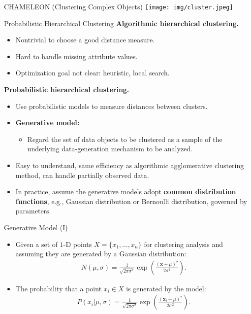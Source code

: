\begin{frame}{CHAMELEON (Clustering Complex Objects)}
	\centering
	\texttt{[image: img/cluster.jpeg]}
\end{frame}

\begin{frame}{Probabilistic Hierarchical Clustering}
	\textbf{Algorithmic hierarchical clustering.}
	\begin{itemize}
		\item Nontrivial to choose a good distance measure.
		\item Hard to handle missing attribute values.
		\item Optimization goal not clear: heuristic, local search.
	\end{itemize}
	\textbf{Probabilistic hierarchical clustering.}
	\begin{itemize}
		\item Use probabilistic models to measure distances between
		      clusters.
		\item \textbf{\color{airforceblue}Generative model:}
		      \begin{itemize}
			      \item Regard the set of data objects to be clustered as a
			            sample of the underlying data-generation mechanism to be
			            analyzed.
		      \end{itemize}
		\item Easy to understand, same efficiency as algorithmic
		      agglomerative clustering method, can handle partially observed data.
		\item In practice, assume the generative models adopt
		      \textbf{\color{airforceblue}common distribution functions}, e.g.,
		      Gaussian distribution or Bernoulli distribution, governed by
		      parameters.
	\end{itemize}
\end{frame}

\begin{frame}{Generative Model (I)}
	\centering
	\begin{itemize}
		\item Given a set of $1$-D points $X = \{x_1, \ldots, x_n\}$ for
		      clustering analysis and assuming they are generated by a Gaussian
		      distribution:
		      \begin{align*}
			      N(\mu,\sigma) = \frac{1}{\sqrt{2 \pi \sigma^2}}
			      \exp\left({\frac{(\mathbf{x}-\mu)^2}{2\sigma^2}}\right).
		      \end{align*}
		\item The probability that a point $x_i \in X$ is generated by the
		      model:
		      \begin{align*}
			      P(x_i \vert \mu, \sigma) = \frac{1}{\sqrt{2\pi\sigma^2}} \exp\left(
			      \frac{(\mathbf{x_i}-\mu)^2}{2\sigma^2}\right).
		      \end{align*}
	\end{itemize}
\end{frame}

